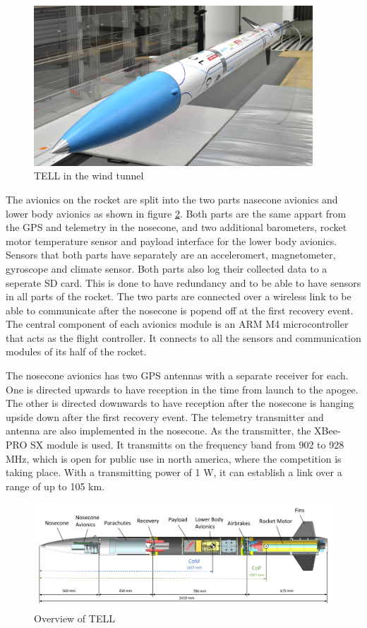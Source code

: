 \begin{figure}[ht]
 \centering
 \includegraphics[height=6cm]{images/TELL_1.png}
 \caption{TELL  in the wind tunnel}
 \label{fig:tell_1}
\end{figure}

The avionics on the rocket are split into the two parts nasecone avionics and lower body avionics as shown in figure \ref{fig:tell_structure}.
Both parts are the same appart from the GPS and telemetry in the nosecone, and two additional barometers, rocket motor temperature sensor and payload interface for the lower body avionics.
Sensors that both parts have separately are an acceleromert, magnetometer, gyroscope and climate sensor.
Both parts also log their collected data to a seperate SD card.
This is done to have redundancy and to be able to have sensors in all parts of the rocket.
The two parts are connected over a wireless link to be able to communicate after the nosecone is popend off at the first recovery event.
The central component of each avionics module is an ARM M4 microcontroller that acts as the flight controller.
It connects to all the sensors and communication modules of its half of the rocket.

The nosecone avionics has two GPS antennas with a separate receiver for each.
One is directed upwards to have reception in the time from launch to the apogee.
The other is directed downwards to have reception after the nosecone is hanging upside down after the first recovery event.
The telemetry transmitter and antenna are also implemented in the nosecone.
As the transmitter, the XBee-PRO SX module is used.
It transmitts on the frequency band from 902 to 928 MHz, which is open for public use in north america, where the competition is taking place.
With a transmitting power of 1 W, it can establish a link over a range of up to 105 km.

\begin{figure}[ht]
 \centering
 \includegraphics[width=\textwidth]{images/TELL_Structure.png}
 \caption{Overview of TELL}
 \label{fig:tell_structure}
\end{figure}

